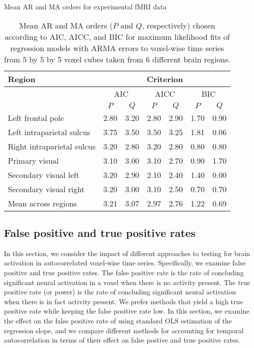 \begin{table}
\ssp
\centering
\caption{Mean AR and MA orders for experimental fMRI data} \label{tab:fmri:arma}
\begin{tabular}{|l|cc|cc|cc|}
\hline
Region & \multicolumn{6}{|c|}{Criterion} \\
\hline
 & \multicolumn{2}{|c|}{AIC} & \multicolumn{2}{|c|}{AICC} & \multicolumn{2}{|c|}{BIC} \\
\hline
 & $P$ & $Q$ & $P$ & $Q$ & $P$ & $Q$ \\
\hline
Left frontal pole          & 2.80 & 3.20 & 2.80 & 2.90 & 1.70 & 0.90 \\
Left intraparietal sulcus  & 3.75 & 3.50 & 3.50 & 3.25 & 1.81 & 0.06 \\
Right intraparietal sulcus & 3.20 & 2.80 & 3.20 & 2.80 & 0.80 & 0.80 \\
Primary visual             & 3.10 & 3.00 & 3.10 & 2.70 & 0.90 & 1.70 \\
Secondary visual left      & 3.20 & 2.90 & 2.10 & 2.40 & 1.40 & 0.00 \\
Secondary visual right     & 3.20 & 3.00 & 3.10 & 2.50 & 0.70 & 0.70 \\
\hline
Mean across regions     & 3.21 & 3.07 & 2.97 & 2.76 & 1.22 & 0.69 \\
\hline
\end{tabular}
\caption*{Mean AR and MA orders ($P$ and $Q$, respectively) chosen according to AIC, AICC, and BIC for maximum likelihood fits of regression models with ARMA errors to voxel-wise time series from 5 by 5 by 5 voxel cubes taken from 6 different brain regions.}
\end{table}

\subsection{False positive and true positive rates \label{sec:fmri:fpr}}

In this section, we consider the impact of different approaches to testing for brain activation in autocorrelated voxel-wise time series. Specifically, we examine false positive and true positive rates. The false positive rate is the rate of concluding significant neural activation in a voxel when there is no activity present. The true positive rate (or power) is the rate of concluding significant neural activation when there is in fact activity present. We prefer methods that yield a high true positive rate while keeping the false positive rate low. In this section, we examine the effect on the false positive rate of using standard OLS estimation of the regression slope, and we compare different methods for accounting for temporal autocorrelation in terms of their effect on false postive and true positive rates.

